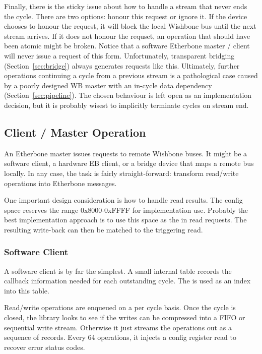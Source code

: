 \documentclass{article}
\begin{document}
Finally, there is the sticky issue about how to handle 
a stream that never ends the cycle.
There are two options:
honour this request or ignore it.
If the device chooses to honour the request,
it will block the local Wishbone bus until the next stream arrives.
If it does not honour the requset,
an operation that should have been atomic might be broken.
Notice that
a software Etherbone master / client will never issue a request of this form.
Unfortunately, 
transparent bridging (Section~\ref{sec:bridge}) always generates requests like this.
Ultimately, 
further operations continuing a cycle from a previous stream
is a pathological case caused by a poorly designed WB master
with an in-cycle data dependency (Section~\ref{sec:pipeline}).
The chosen behaviour is left open as an implementation decision,
but it is probably wisest to implicitly terminate cycles on stream end.

\subsection{Client / Master Operation}
\label{sec:eb-master}

An Etherbone master issues requests to remote Wishbone buses.
It might be a software client,
a hardware EB client,
or a bridge device that maps a remote bus locally.
In any case, the task is fairly straight-forward:
transform read/write operations into Etherbone messages.

One important design consideration is how to handle read results.
The config space reserves the range 0x8000-0xFFFF for implementation use.
Probably the best implementation approach is to use this space as the
 in read requests.
The resulting write-back can then be matched to the triggering read.

\subsubsection{Software Client}

A software client is by far the simplest.
A small internal table records the 
callback information needed for each outstanding cycle.
The  is used as an index into this table.

Read/write operations are enqueued on a per cycle basis.
Once the cycle is closed,
the library looks to see if the writes can be compressed into a FIFO or
sequential write stream.
Otherwise it just streams the operations out as a sequence of records.
Every 64 operations, 
it injects a config register read to recover error status codes.
\end{document}
